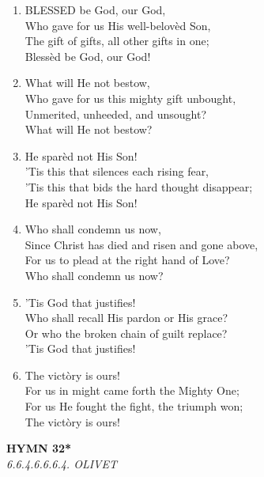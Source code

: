 \begin{enumerate}
    \item BLESSED be God, our God, \\
        Who gave for us His well-belov\`ed Son, \\
        The gift of gifts, all other gifts in one; \\
        Bless\`ed be God, our God!

    \item What will He not bestow, \\
        Who gave for us this mighty gift unbought, \\
        Unmerited, unheeded, and unsought? \\
        What will He not bestow?

    \item He spar\`ed not His Son! \\
        'Tis this that silences each rising fear, \\
        'Tis this that bids the hard thought disappear; \\
        He spar\`ed not His Son!

    \item Who shall condemn us now, \\
        Since Christ has died and risen and gone above, \\
        For us to plead at the right hand of Love? \\
        Who shall condemn us now?

    \item 'Tis God that justifies! \\
        Who shall recall His pardon or His grace? \\
        Or who the broken chain of guilt replace? \\
        'Tis God that justifies!

    \item The vict\`ory is ours! \\
        For us in might came forth the Mighty One; \\
        For us He fought the fight, the triumph won; \\
        The vict\`ory is ours!

\end{enumerate}

\newpage
\begin{center}
    {\Large \textbf{HYMN 32*}}
    \\
    \textit{6.6.4.6.6.6.4. OLIVET}
\end{center}
\vspace{1em}

